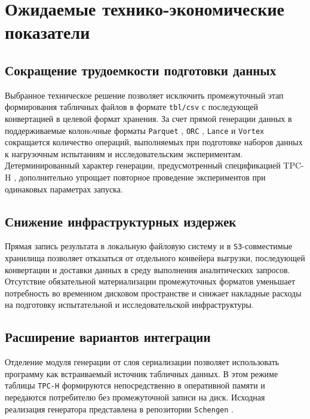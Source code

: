 \section{Ожидаемые технико-экономические показатели}

\subsection{Сокращение трудоемкости подготовки данных}

Выбранное техническое решение позволяет исключить промежуточный этап
формирования табличных файлов в формате \texttt{tbl/csv}  с
последующей
конвертацией в целевой формат хранения. За счет прямой генерации данных в
поддерживаемые колонoчные форматы \texttt{Parquet} ,
\texttt{ORC} , \texttt{Lance}  и \texttt{Vortex}
 сокращается количество операций, выполняемых при подготовке наборов
данных к нагрузочным испытаниям и исследовательским экспериментам.
Детерминированный характер генерации, предусмотренный спецификацией TPC-H
, дополнительно упрощает повторное
проведение экспериментов при одинаковых параметрах запуска.

\subsection{Снижение инфраструктурных издержек}

Прямая запись результата в локальную файловую систему и в
\texttt{S3}-совместимые хранилища позволяет отказаться от отдельного конвейера
выгрузки, последующей конвертации и доставки данных в среду выполнения
аналитических запросов. Отсутствие обязательной материализации промежуточных
форматов уменьшает потребность во временном дисковом пространстве и снижает
накладные расходы на подготовку испытательной и исследовательской
инфраструктуры.

\subsection{Расширение вариантов интеграции}

Отделение модуля генерации от слоя сериализации позволяет
использовать программу как встраиваемый источник табличных данных. В этом
режиме таблицы \texttt{TPC-H} формируются непосредственно в оперативной
памяти и передаются потребителю без промежуточной записи на диск. Исходная
реализация генератора представлена в репозитории \texttt{Schengen}
.

